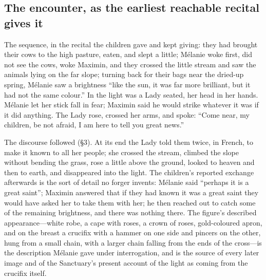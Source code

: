 \subsection{The encounter, as the earliest reachable recital gives
it}

The sequence, in the recital the children gave and kept giving: they
had brought their cows to the high pasture, eaten, and slept a
little; Mélanie woke first, did not see the cows, woke Maximin, and
they crossed the little stream and saw the animals lying on the far
slope; turning back for their bags near the dried-up spring, Mélanie
saw a brightness ``like the sun, it was far more brilliant, but it
had not the same colour.'' In the light was a Lady seated, her head
in her hands. Mélanie let her stick fall in fear; Maximin said he
would strike whatever it was if it did anything. The Lady rose,
crossed her arms, and spoke: ``Come near, my children, be not
afraid, I am here to tell you great news.''

The discourse followed (\S3). At its end the Lady told them twice,
in French, to make it known to all her people; she crossed the
stream, climbed the slope without bending the grass, rose a little
above the ground, looked to heaven and then to earth, and
disappeared into the light. The children's reported exchange
afterwards is the sort of detail no forger invents: Mélanie said
``perhaps it is a great saint''; Maximin answered that if they had
known it was a great saint they would have asked her to take them
with her; he then reached out to catch some of the remaining
brightness, and there was nothing there. The figure's described appearance---white robe, a cape
with roses, a crown of roses, gold-coloured apron, and on the breast
a crucifix with a hammer on one side and pincers on the other, hung
from a small chain, with a larger chain falling from the ends of the
cross---is the description Mélanie gave under interrogation, and is
the source of every later image and of the Sanctuary's present
account of the light as coming from the crucifix
itself.

